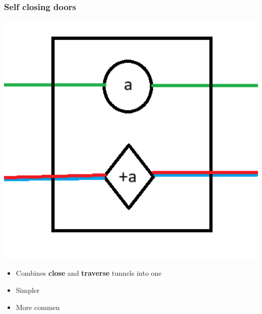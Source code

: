 \documentclass{beamer}
\begin{document}
\begin{frame}
  \frametitle{Self closing doors}
  \begin{minipage}[t]{0.49\textwidth}
    \includegraphics[width=1\textwidth]{res/SelfClosingDoor.png}
  \end{minipage}
  \begin{minipage}[t]{0.49\textwidth}
    \begin{itemize}
      \item Combines \textbf{close} and \textbf{traverse} tunnels into one
      \item Simpler
      \item More commen
    \end{itemize}
  \end{minipage}
\end{frame}
\end{document}

